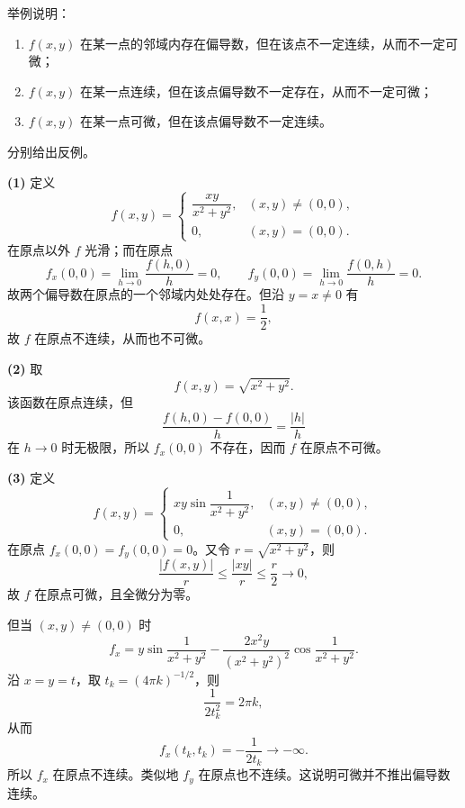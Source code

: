 \begin{xthought}[3]
举例说明：
  \begin{enumerate}[label=(\arabic*)]
    \item $f(x,y)$ 在某一点的邻域内存在偏导数，但在该点不一定连续，从而不一定可微；
    \item $f(x,y)$ 在某一点连续，但在该点偏导数不一定存在，从而不一定可微；
    \item $f(x,y)$ 在某一点可微，但在该点偏导数不一定连续。
  \end{enumerate}
\end{xthought}
\begin{xsolution}
分别给出反例。

\textbf{(1)} 定义
\[
  f(x,y)=
  \begin{cases}
    \dfrac{xy}{x^2+y^2},&(x,y)\ne(0,0),\\
    0,&(x,y)=(0,0).
  \end{cases}
\]
在原点以外 $f$ 光滑；而在原点
\[
  f_x(0,0)=\lim_{h\to0}\frac{f(h,0)}h=0,
  \qquad
  f_y(0,0)=\lim_{h\to0}\frac{f(0,h)}h=0.
\]
故两个偏导数在原点的一个邻域内处处存在。但沿 $y=x\ne0$ 有
\[
  f(x,x)=\frac12,
\]
故 $f$ 在原点不连续，从而也不可微。

\textbf{(2)} 取
\[
  f(x,y)=\sqrt{x^2+y^2}.
\]
该函数在原点连续，但
\[
  \frac{f(h,0)-f(0,0)}h=\frac{|h|}{h}
\]
在 $h\to0$ 时无极限，所以 $f_x(0,0)$ 不存在，因而 $f$ 在原点不可微。

\textbf{(3)} 定义
\[
  f(x,y)=
  \begin{cases}
    xy\sin\dfrac1{x^2+y^2},&(x,y)\ne(0,0),\\
    0,&(x,y)=(0,0).
  \end{cases}
\]
在原点 $f_x(0,0)=f_y(0,0)=0$。又令 $r=\sqrt{x^2+y^2}$，则
\[
  \frac{|f(x,y)|}{r}
  \le\frac{|xy|}{r}
  \le\frac{r}{2}\to0,
\]
故 $f$ 在原点可微，且全微分为零。

但当 $(x,y)\ne(0,0)$ 时
\[
  f_x=y\sin\frac1{x^2+y^2}
  -\frac{2x^2y}{(x^2+y^2)^2}\cos\frac1{x^2+y^2}.
\]
沿 $x=y=t$，取 $t_k=(4\pi k)^{-1/2}$，则
\[
  \frac1{2t_k^2}=2\pi k,
\]
从而
\[
  f_x(t_k,t_k)=-\frac1{2t_k}\to-\infty.
\]
所以 $f_x$ 在原点不连续。类似地 $f_y$ 在原点也不连续。这说明可微并不推出偏导数连续。
\end{xsolution}


